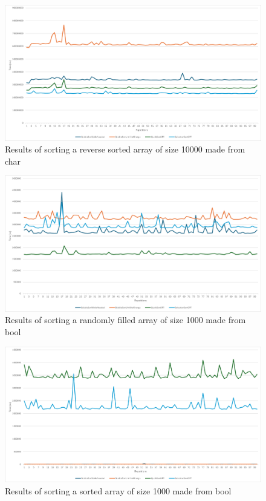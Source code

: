 \documentclass{article}
\begin{document}
\begin{figure}[!h]
    \centering
    \includegraphics[width=0.7\linewidth]{char_10000_reverse_sorted.png}
    \caption{Results of sorting a reverse sorted array of size 10000 made from char}
    \label{fig:char_10000_reverse_sorted}
\end{figure}


\begin{figure}[!h]
    \centering
    \includegraphics[width=0.7\linewidth]{bool_1000_random.png}
    \caption{Results of sorting a randomly filled array of size 1000 made from bool}
    \label{fig:bool_1000_random}
\end{figure}

\begin{figure}[!h]
    \centering
    \includegraphics[width=0.7\linewidth]{bool_1000_sorted.png}
    \caption{Results of sorting a sorted array of size 1000 made from bool}
    \label{fig:bool_1000_sorted}
\end{figure}
\end{document}
